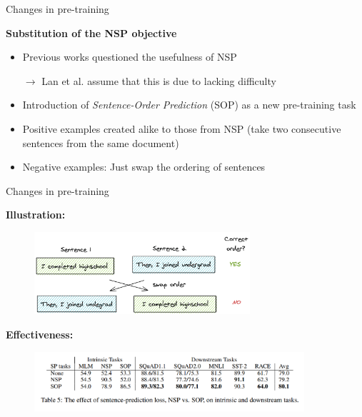
\begin{frame}{Changes in pre-training}

\vfill

	\textbf{Substitution of the NSP objective}
		
	\begin{itemize}
			\item Previous works questioned the usefulness of NSP
			\item[$\to$] Lan et al. assume that this is due to lacking difficulty
			\item Introduction of \textit{Sentence-Order Prediction} (SOP) as a new pre-training task
			\item Positive examples created alike to those from NSP (take two consecutive sentences from the same document)
			\item Negative examples: Just swap the ordering of sentences
	\end{itemize}

\vfill

\end{frame}


\begin{frame}{Changes in pre-training}

\vfill

	\textbf{Illustration:}
		
	\begin{figure}
		\centering
		\includegraphics[width = 8cm]{figure/52-albert-sop.png}\\ 
	\end{figure}

	\textbf{Effectiveness:}
		
	\begin{figure}
		\centering
		\includegraphics[width = 10cm]{figure/52-albert-sop-ablation.png}\\ 
	\end{figure}

\vfill

\end{frame}

